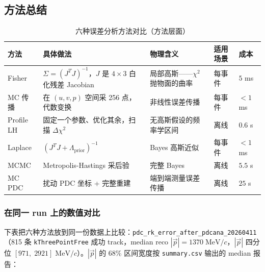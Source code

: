 \documentclass[a4paper, 11pt]{article}
\begin{document}
\subsection{方法总结}

\begin{table}[H]
\centering
\caption{六种误差分析方法对比（方法层面）}
\label{tab:error_methods}
\begin{tabular}{p{2.4cm}p{3.8cm}p{3.5cm}p{2.0cm}p{1.8cm}}
\toprule
方法 & 具体做法 & 物理含义 & 适用场景 & 成本 \\
\midrule
Fisher & $\Sigma = (J^TJ)^{-1}$，$J$ 是 $4{\times}3$ 白化残差 Jacobian & 局部高斯——$\chi^2$ 抛物面的曲率 & 每事件 & $5$ ms \\
MC 传播 & 在 $(u,v,p)$ 空间采 256 点，代数变换 & 非线性误差传播 & 每事件 & $<\!1$ ms \\
Profile LH & 固定一个参数、优化其余，扫描 $\Delta\chi^2$ & 无高斯假设的频率学区间 & 离线 & $0.6$ s \\
Laplace & $(J^TJ + \Lambda_\mathrm{prior})^{-1}$ & Bayes 高斯近似 & 每事件 & $<\!1$ ms \\
MCMC & Metropolis-Hastings 采后验 & 完整 Bayes & 离线 & $5.5$ s \\
MC PDC & 扰动 PDC 坐标 + 完整重建 & 端到端测量误差传播 & 离线 & $25$ s \\
\bottomrule
\end{tabular}
\end{table}

\subsubsection*{在同一 run 上的数值对比}

下表把六种方法放到同一份数据上比较：\texttt{pdc\_rk\_error\_after\_pdcana\_20260411}（815 条 \texttt{kThreePointFree} 成功 track，median reco $|\vec{p}| = 1370\;\mathrm{MeV}/c$，$|\vec{p}|$ 四分位 $[971,\;2921]\;\mathrm{MeV}/c$）。$|\vec{p}|$ 的 68\% 区间宽度按 \texttt{summary.csv} 输出的 median 报告：
\end{document}
